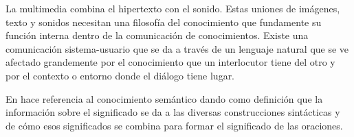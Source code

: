 La multimedia combina el hipertexto con el sonido. Estas uniones de imágenes, texto y sonidos necesitan una filosofía del conocimiento que fundamente su función interna dentro de la comunicación de conocimientos. Existe una comunicación sistema-usuario que se da a través de un lenguaje natural que se ve afectado grandemente por el conocimiento que un interlocutor tiene del otro y por el contexto o entorno donde el diálogo tiene lugar. 


En \cite{Arquitectura} hace referencia al conocimiento semántico dando como definición que la información sobre el significado se da a las diversas construcciones sintácticas y de cómo esos significados se combina para formar el significado de las oraciones.

 